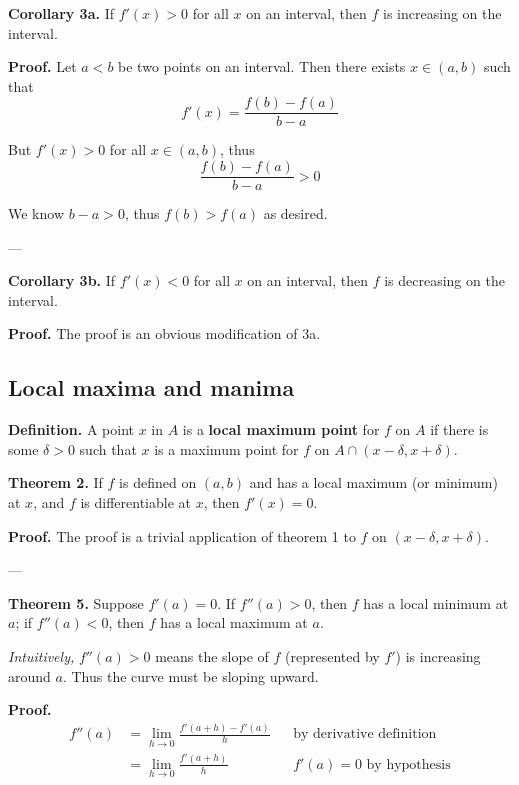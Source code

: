 \vs

\textbf{Corollary 3a.} If $f'(x)>0$ for all $x$ on an interval, then
$f$ is increasing on the interval.

\vs

\textbf{Proof.} Let $a<b$ be two points on an interval. Then there
exists $x\in(a,b)$ such that
\[f'(x)=\frac{f(b)-f(a)}{b-a}\]

But $f'(x)>0$ for all $x\in(a,b)$, thus
\[\frac{f(b)-f(a)}{b-a}>0\]

We know $b-a>0$, thus $f(b)>f(a)$ as desired.

\vs---\vs

\textbf{Corollary 3b.} If $f'(x)<0$ for all $x$ on an interval, then
$f$ is decreasing on the interval.

\vs

\textbf{Proof.} The proof is an obvious modification of 3a.

\subsection{Local maxima and manima}
\textbf{Definition.} A point $x$ in $A$ is a \textbf{local maximum
  point} for $f$ on $A$ if there is some $\delta>0$ such that $x$ is a
maximum point for $f$ on $A\cap(x-\delta, x+\delta)$.

\vs

\textbf{Theorem 2.} If $f$ is defined on $(a,b)$ and has a local
maximum (or minimum) at $x$, and $f$ is differentiable at $x$, then
$f'(x)=0$.

\vs

\textbf{Proof.} The proof is a trivial application of theorem 1 to $f$
on $(x-\delta, x+\delta)$.

\vs---\vs

\textbf{Theorem 5.} Suppose $f'(a)=0$. If $f''(a)>0$, then $f$ has a
local minimum at $a$; if $f''(a)<0$, then $f$ has a local maximum at
$a$.

\vs

\textit{Intuitively,} $f''(a)>0$ means the slope of $f$ (represented
by $f'$) is increasing around $a$. Thus the curve must be sloping
upward.

\vs

\textbf{Proof.}
\begin{align*}
  f''(a)&=\lim_{h\to0}\frac{f'(a+h)-f'(a)}{h}&&\text{by derivative definition}\\
        &=\lim_{h\to0}\frac{f'(a+h)}{h}&&\text{$f'(a)=0$ by hypothesis}\\
\end{align*}

